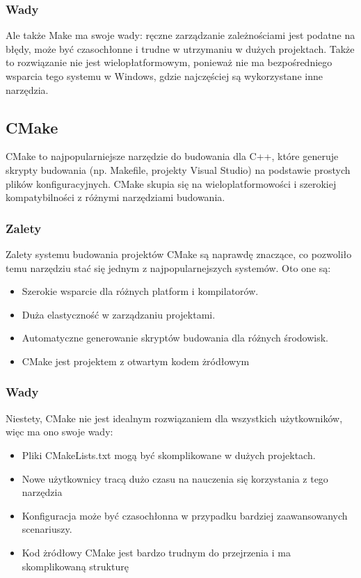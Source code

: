 \subsubsection{Wady}
Ale także Make ma swoje wady: ręczne zarządzanie zależnościami jest podatne na błędy, może być czasochłonne i trudne w utrzymaniu w dużych projektach. Także to rozwiązanie nie jest wielopłatformowym, ponieważ nie ma bezpośredniego wsparcia tego systemu w Windows, gdzie najczęściej są wykorzystane inne narzędzia.

\subsection{CMake}
CMake to najpopularniejsze narzędzie do budowania dla C++, które generuje skrypty budowania (np. Makefile, projekty Visual Studio) na podstawie prostych plików konfiguracyjnych. CMake skupia się na wieloplatformowości i szerokiej kompatybilności z różnymi narzędziami budowania.

\subsubsection{Zalety}
Zalety systemu budowania projektów CMake są naprawdę znaczące, co pozwoliło temu narzędziu stać się jednym z najpopularnejszych systemów. Oto one są:

\begin{itemize}
    \item Szerokie wsparcie dla różnych platform i kompilatorów.
    \item Duża elastyczność w zarządzaniu projektami.
    \item Automatyczne generowanie skryptów budowania dla różnych środowisk.
    \item CMake jest projektem z otwartym kodem żródłowym
\end{itemize}

\subsubsection{Wady}
Niestety, CMake nie jest idealnym rozwiązaniem dla wszystkich użytkowników, więc ma ono swoje wady:

\begin{itemize}
    \item Pliki CMakeLists.txt mogą być skomplikowane w dużych projektach.
    \item Nowe użytkownicy tracą dużo czasu na nauczenia się korzystania z tego narzędzia
    \item Konfiguracja może być czasochłonna w przypadku bardziej zaawansowanych scenariuszy.
    \item Kod żródłowy CMake jest bardzo trudnym do przejrzenia i ma skomplikowaną strukturę
\end{itemize}

